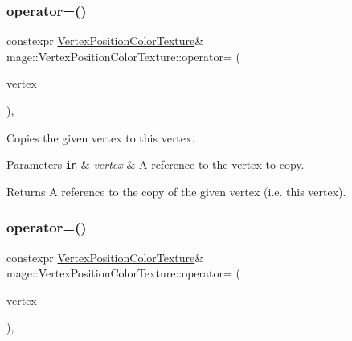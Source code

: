 \subsubsection{\texorpdfstring{operator=()}{operator=()}\hspace{0.1cm}{\footnotesize\ttfamily [1/2]}}
{\footnotesize\ttfamily constexpr \hyperlink{structmage_1_1_vertex_position_color_texture}{Vertex\+Position\+Color\+Texture}\& mage\+::\+Vertex\+Position\+Color\+Texture\+::operator= (\begin{DoxyParamCaption}\item[{const \hyperlink{structmage_1_1_vertex_position_color_texture}{Vertex\+Position\+Color\+Texture} \&}]{vertex }\end{DoxyParamCaption})\hspace{0.3cm}{\ttfamily [default]}, {\ttfamily [noexcept]}}

Copies the given vertex to this vertex.


\begin{DoxyParams}[1]{Parameters}
\mbox{\tt in}  & {\em vertex} & A reference to the vertex to copy. \\
\hline
\end{DoxyParams}
\begin{DoxyReturn}{Returns}
A reference to the copy of the given vertex (i.\+e. this vertex). 
\end{DoxyReturn}
\hypertarget{structmage_1_1_vertex_position_color_texture_adbfea7798323727998fff85ba253bd7a}{}\label{structmage_1_1_vertex_position_color_texture_adbfea7798323727998fff85ba253bd7a} 
\subsubsection{\texorpdfstring{operator=()}{operator=()}\hspace{0.1cm}{\footnotesize\ttfamily [2/2]}}
{\footnotesize\ttfamily constexpr \hyperlink{structmage_1_1_vertex_position_color_texture}{Vertex\+Position\+Color\+Texture}\& mage\+::\+Vertex\+Position\+Color\+Texture\+::operator= (\begin{DoxyParamCaption}\item[{\hyperlink{structmage_1_1_vertex_position_color_texture}{Vertex\+Position\+Color\+Texture} \&\&}]{vertex }\end{DoxyParamCaption})\hspace{0.3cm}{\ttfamily [default]}, {\ttfamily [noexcept]}}

